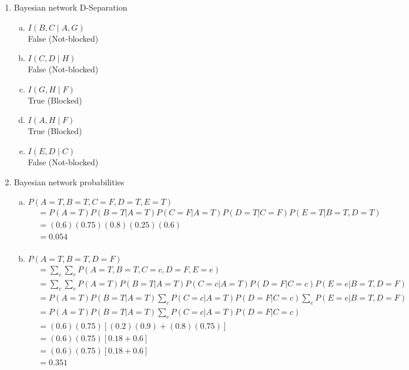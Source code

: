 \documentclass[10pt,draftclsnofoot,onecolumn]{IEEEtran}
\begin{document}
\begin{enumerate}
  \item Bayesian network D-Separation
  \begin{enumerate}[a)]
    \item $ I(B,C \; | \; {A,G}) $ \\
    False (Not-blocked) \\
    \item $ I(C,D \; | \; H) $ \\
    False (Not-blocked) \\
    \item $ I(G,H \; | \; F) $ \\
    True (Blocked) \\
    \item $ I(A,H \; | \; F) $ \\
    True (Blocked) \\
    \item $ I(E,D \; | \; C) $ \\
    False (Not-blocked) \\
  \end{enumerate}

  \item Bayesian network probabilities
  \begin{enumerate}[a)]
    \item $ P(A=T, B=T, C=F, D=T, E=T) $
    \begin{align*}
      &= P(A=T)P(B=T|A=T)P(C=F|A=T)P(D=T|C=F)P(E=T|B=T,D=T) \\
      &= (0.6)(0.75)(0.8)(0.25)(0.6) \\
      &= 0.054 \\
    \end{align*}

    \item $ P(A=T, B=T, D=F) $
    \begin{align*}
      &= \sum_{c} \sum_{e} P(A=T, B=T, C=c, D=F, E=e) \\
      &= \sum_{c} \sum_{e} P(A=T)P(B=T|A=T)P(C=c|A=T)P(D=F|C=c)P(E=e|B=T,D=F) \\
      &= P(A=T)P(B=T|A=T) \sum_{c} P(C=c|A=T)P(D=F|C=c) \sum_{e} P(E=e|B=T,D=F) \\
      &= P(A=T)P(B=T|A=T) \sum_{c} P(C=c|A=T)P(D=F|C=c) \\
      &= (0.6)(0.75)[(0.2)(0.9) + (0.8)(0.75)] \\
      &= (0.6)(0.75)[0.18 + 0.6] \\
      &= (0.6)(0.75)[0.18 + 0.6] \\
      &= 0.351 \\
    \end{align*}


\end{enumerate}
\end{enumerate}
\end{document}
